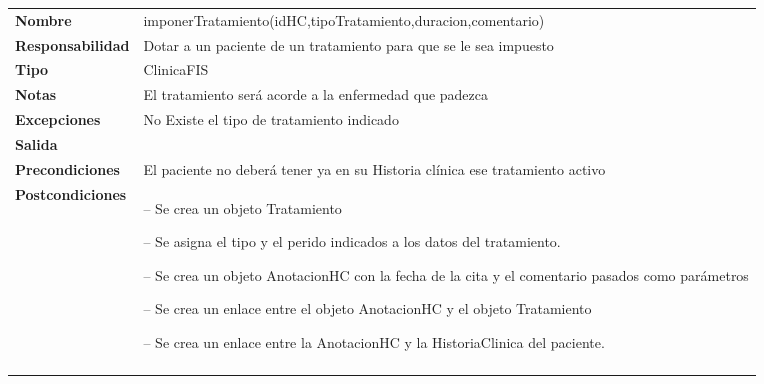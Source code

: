 \begin{table}[H]
\centering
	  \begin{tabularx}{\textwidth}{l|X}
    \textbf{Nombre}        & imponerTratamiento(idHC,tipoTratamiento,duracion,comentario) \\ 
    \textbf{Responsabilidad}  & Dotar a un paciente de un tratamiento para que se le sea impuesto  \\ 
    \textbf{Tipo}        & ClinicaFIS \\ 
    \textbf{Notas}        &  El tratamiento será acorde a la enfermedad que padezca\\ 
    \textbf{Excepciones}    & No Existe el tipo de tratamiento indicado \\ 
    \textbf{Salida}        &  \\ 
    \textbf{Precondiciones}    & El paciente no deberá tener ya en su Historia clínica ese tratamiento activo \\ 
    \textbf{Postcondiciones}  &  
    \begin{itemizenomargins}
   \item[--] Se crea un objeto Tratamiento
   \item[--] Se asigna el tipo y el perido indicados a los datos del tratamiento.
   \item[--] Se crea un objeto AnotacionHC con la fecha de la cita y el comentario pasados como parámetros
   \item[--] Se crea un enlace entre el objeto AnotacionHC y el objeto Tratamiento
   \item[--] Se crea un enlace entre la AnotacionHC y la HistoriaClinica del paciente.
   \end{itemizenomargins}\\ \\ 
  \end{tabularx}

\end{table}




